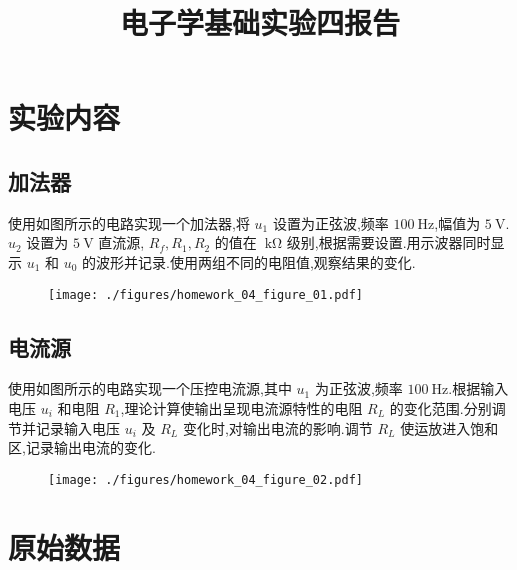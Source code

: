 
\usepackage{../../homeworks_preamble}
\title{电子学基础实验四报告}


    \maketitle
    \section{实验内容}
        \subsection{加法器}
        使用如图所示的电路实现一个加法器,将 $u_1$ 设置为正弦波,频率 $100 \ \mathrm{Hz}$,幅值为 $5 \ \mathrm{V}$. $u_2$ 设置为 $5 \ \mathrm{V}$ 直流源, $R_{f},R_1,R_2$ 的值在 $\ \mathrm{k\Omega}$ 级别,根据需要设置.用示波器同时显示 $u_1$ 和 $u_0$ 的波形并记录.使用两组不同的电阻值,观察结果的变化.
        \begin{figure}[htbp]
            \centering
            \texttt{[image: ./figures/homework\_04\_figure\_01.pdf]}
        \end{figure}
        \subsection{电流源}
        使用如图所示的电路实现一个压控电流源,其中 $u_1$ 为正弦波,频率 $100 \ \mathrm{Hz}$.根据输入电压 $u_{i}$ 和电阻 $R_1$,理论计算使输出呈现电流源特性的电阻 $R_{L}$ 的变化范围.分别调节并记录输入电压 $u_{i}$ 及 $R_{L}$ 变化时,对输出电流的影响.调节 $R_{L}$ 使运放进入饱和区,记录输出电流的变化.
        \begin{figure}[htbp]
            \centering
            \texttt{[image: ./figures/homework\_04\_figure\_02.pdf]}
        \end{figure}
    \section{原始数据}
